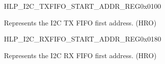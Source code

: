     
    \begin{register}{H}{LP\_I2C\_TXFIFO\_START\_ADDR\_REG}{0x0100}\label{regdesc:LPI2CTXFIFOSTARTADDRREG}
    \regnewline%
    \begin{regdesc}\begin{reglist}
    \label{fielddesc:LPI2CTXFIFOSTARTADDR}\item [LP\_I2C\_TXFIFO\_START\_ADDR] Represents the I2C TX FIFO first address. (HRO)
    \end{reglist}\end{regdesc}
    \end{register}
    
    
    \begin{register}{H}{LP\_I2C\_RXFIFO\_START\_ADDR\_REG}{0x0180}\label{regdesc:LPI2CRXFIFOSTARTADDRREG}
    \regnewline%
    \begin{regdesc}\begin{reglist}
    \label{fielddesc:LPI2CRXFIFOSTARTADDR}\item [LP\_I2C\_RXFIFO\_START\_ADDR] Represents the I2C RX FIFO first address. (HRO)
    \end{reglist}\end{regdesc}
    \end{register}
    
    
    